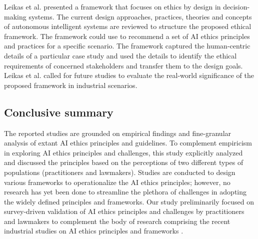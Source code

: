 Leikas et al. \cite{leikas2019ethical} presented a framework that focuses on ethics by design in decision-making systems. The current design approaches, practices, theories and concepts of autonomous intelligent systems are reviewed to structure the proposed ethical framework. The framework could use to recommend a set of AI ethics principles and practices for a specific scenario. The framework captured the human-centric details of a particular case study and used the details to identify the ethical requirements of concerned stakeholders and transfer them to the design goals. Leikas et al. \cite{leikas2019ethical} called for future studies to evaluate the real-world significance of the proposed framework in industrial scenarios.

\subsection{Conclusive summary}
The reported studies \cite{lu2022software}\cite{lu2022towards}\cite{vakkuri2022software}\cite{ibanez2021operationalising} are grounded on empirical findings and fine-granular analysis of extant AI ethics principles and guidelines. To complement empiricism in exploring AI ethics principles and challenges, this study explicitly analyzed and discussed the principles based on the perceptions of two different types of populations (practitioners and lawmakers). Studies \cite{vakkuri2021eccola}\cite{floridi2018ai4people}\cite{leikas2019ethical} are conducted to  design various frameworks to operationalize the AI ethics principles; however, no research has yet been done to streamline the plethora of challenges in adopting the widely defined principles and frameworks. Our study preliminarily focused on survey-driven validation of AI ethics principles and challenges by practitioners and lawmakers to complement the body of research comprising the recent industrial studies on AI ethics principles \cite{lu2022software}\cite{lu2022towards}\cite{vakkuri2022software}\cite{ibanez2021operationalising} and frameworks \cite{vakkuri2021eccola}\cite{floridi2018ai4people}\cite{leikas2019ethical}.